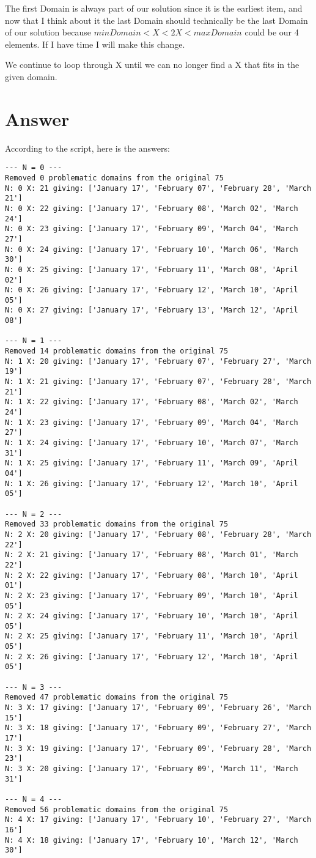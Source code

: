 \documentclass{article}
\begin{document}
    The first Domain is always part of our solution since it is the earliest item, and now that I think about it the last Domain should technically
    be the last Domain of our solution because $minDomain < X < 2X < maxDomain$ could be our 4 elements. If I have time I will make this change.

    We continue to loop through X until we can no longer find a X that fits in the given domain.

  \section{Answer}
    According to the script, here is the answers:
    \begin{verbatim}
--- N = 0 ---
Removed 0 problematic domains from the original 75
N: 0 X: 21 giving: ['January 17', 'February 07', 'February 28', 'March 21']
N: 0 X: 22 giving: ['January 17', 'February 08', 'March 02', 'March 24']
N: 0 X: 23 giving: ['January 17', 'February 09', 'March 04', 'March 27']
N: 0 X: 24 giving: ['January 17', 'February 10', 'March 06', 'March 30']
N: 0 X: 25 giving: ['January 17', 'February 11', 'March 08', 'April 02']
N: 0 X: 26 giving: ['January 17', 'February 12', 'March 10', 'April 05']
N: 0 X: 27 giving: ['January 17', 'February 13', 'March 12', 'April 08']

--- N = 1 ---
Removed 14 problematic domains from the original 75
N: 1 X: 20 giving: ['January 17', 'February 07', 'February 27', 'March 19']
N: 1 X: 21 giving: ['January 17', 'February 07', 'February 28', 'March 21']
N: 1 X: 22 giving: ['January 17', 'February 08', 'March 02', 'March 24']
N: 1 X: 23 giving: ['January 17', 'February 09', 'March 04', 'March 27']
N: 1 X: 24 giving: ['January 17', 'February 10', 'March 07', 'March 31']
N: 1 X: 25 giving: ['January 17', 'February 11', 'March 09', 'April 04']
N: 1 X: 26 giving: ['January 17', 'February 12', 'March 10', 'April 05']

--- N = 2 ---
Removed 33 problematic domains from the original 75
N: 2 X: 20 giving: ['January 17', 'February 08', 'February 28', 'March 22']
N: 2 X: 21 giving: ['January 17', 'February 08', 'March 01', 'March 22']
N: 2 X: 22 giving: ['January 17', 'February 08', 'March 10', 'April 01']
N: 2 X: 23 giving: ['January 17', 'February 09', 'March 10', 'April 05']
N: 2 X: 24 giving: ['January 17', 'February 10', 'March 10', 'April 05']
N: 2 X: 25 giving: ['January 17', 'February 11', 'March 10', 'April 05']
N: 2 X: 26 giving: ['January 17', 'February 12', 'March 10', 'April 05']

--- N = 3 ---
Removed 47 problematic domains from the original 75
N: 3 X: 17 giving: ['January 17', 'February 09', 'February 26', 'March 15']
N: 3 X: 18 giving: ['January 17', 'February 09', 'February 27', 'March 17']
N: 3 X: 19 giving: ['January 17', 'February 09', 'February 28', 'March 23']
N: 3 X: 20 giving: ['January 17', 'February 09', 'March 11', 'March 31']

--- N = 4 ---
Removed 56 problematic domains from the original 75
N: 4 X: 17 giving: ['January 17', 'February 10', 'February 27', 'March 16']
N: 4 X: 18 giving: ['January 17', 'February 10', 'March 12', 'March 30']
  \end{verbatim}
\end{document}
